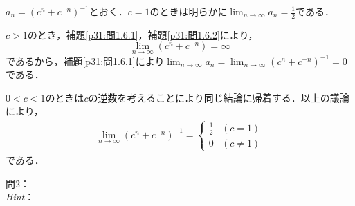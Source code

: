\documentclass[dvipdfmx,uplatex,11pt]{jsarticle}
\theoremstyle{definition}
\begin{document}
\begin{leftbar}
    $a_n = (c^n +c^{-n})^{-1}$とおく．$c=1$のときは明らかに$\lim_{n \to \infty} a_n =\frac{1}{2}$である．\par 
    $c>1$のとき，補題\ref{p31:問1.6.1}，補題\ref{p31:問1.6.2}により，
    \[
        \lim_{n \to \infty} (c^n + c^{-n}) = \infty
    \]
    であるから，補題\ref{p31:問1.6.1}により$\lim_{n \to \infty} a_n = \lim_{n \to \infty} (c^n +c^{-n})^{-1} =0$である．\par 
    $0<c<1$のときは$c$の逆数を考えることにより同じ結論に帰着する．以上の議論により，
    \begin{align*}
        \lim_{n \to \infty} (c^n +c^{-n})^{-1} =
        \begin{cases}
            \frac{1}{2}&(c=1)\\
            0 & (c \ne 1)
        \end{cases}
    \end{align*}
    である．
\end{leftbar}
\newpage
\noindent
問2：\\
\textsl{Hint}：\\
\dotfill
\end{document}
